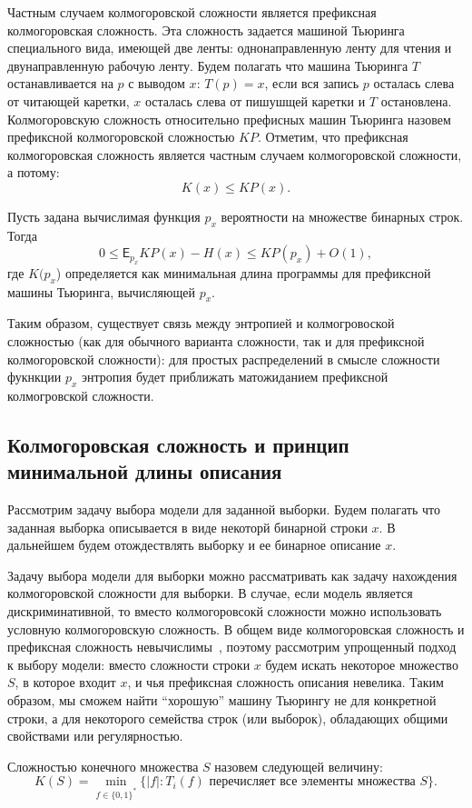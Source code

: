 \documentclass[../main.tex]{subfiles}
\begin{document}
Частным случаем колмогоровской сложности является префиксная колмогоровская  сложность. Эта сложность задается машиной Тьюринга специального вида, имеющей две ленты: однонаправленную ленту для чтения и двунаправленную рабочую ленту. Будем полагать что машина Тьюринга $T$ останавливается на $p$ с выводом $x$: $T(p) = x$, если вся запись $p$ осталась слева от читающей каретки, $x$ осталась слева от пишушщей каретки и $T$ остановлена. Колмогоровскую сложность относительно префисных машин Тьюринга назовем префиксной колмогоровской сложностью $KP$.
Отметим, что префиксная колмогоровская сложность является частным случаем колмогоровской сложности, а потому:
\[
K(x) \leq KP(x).
\]

\begin{theorembd}
Пусть задана вычислимая функция $p_x$ вероятности на множестве бинарных строк.
Тогда
\[
    0 \leq \mathsf{E}_{p_x}KP(x) - H(x) \leq KP(p_x) + O(1),
\]
где $K(p_x$) определяется как минимальная длина программы для префиксной машины Тьюринга, вычисляющей $p_x$.
\end{theorembd} 

Таким образом, существует связь между энтропией и колмогровоской сложностью (как для обычного варианта сложности, так и для префиксной колмогоровской сложности): для простых распределений в смысле сложности фукнкции $p_x$ энтропия будет приближать матожиданием префиксной колмогровской сложности. 

\subsection{Колмогоровская сложность и принцип минимальной длины описания}
Рассмотрим задачу выбора модели для заданной выборки. Будем полагать что заданная выборка описывается в виде некоторй бинарной строки $x$. В дальнейшем будем отождествлять выборку и ее бинарное описание $x$.

Задачу выбора модели для выборки можно рассматривать как задачу нахождения колмогоровской сложности для выборки. В случае, если модель является дискриминативной, то вместо колмогоровсокй сложности можно использовать условную колмогоровскую сложность.
В общем виде колмогоровская сложность и префиксная сложность невычислимы~\cite{kolmogorov}, поэтому рассмотрим упрощенный подход к выбору модели: вместо сложности строки $x$ будем искать некоторое множество $S$, в которое входит $x$, и чья префиксная сложность описания невелика. Таким образом, мы сможем найти ``хорошую'' машину Тьюрингу не для конкретной строки, а для некоторого семейства строк (или выборок), обладающих общими свойствами или регулярностью.
\begin{definition}
Сложностью конечного множества $S$ назовем следующей величину:
\[
K(S) = \min_{f \in \{0,1\}^*}\{|f|: T_i(f) \text{ перечисляет все элементы множества } S\}.
\]
\end{definition}
\end{document}
